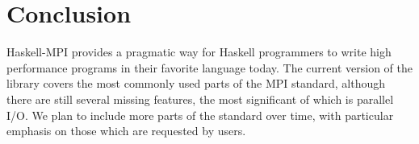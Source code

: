 \documentclass{tmr}
\begin{document}
%
%
%
%
%
%
%
%
%
%
%

\section{Conclusion}

Haskell-MPI provides a pragmatic way for Haskell programmers to write high performance programs in
their favorite language today. The current version of the library covers the most commonly used parts of
the MPI standard, although there are still several missing features, the most significant of which is
parallel I/O. We plan to include more parts of the standard over time, with particular emphasis on those
which are requested by users.
\end{document}
